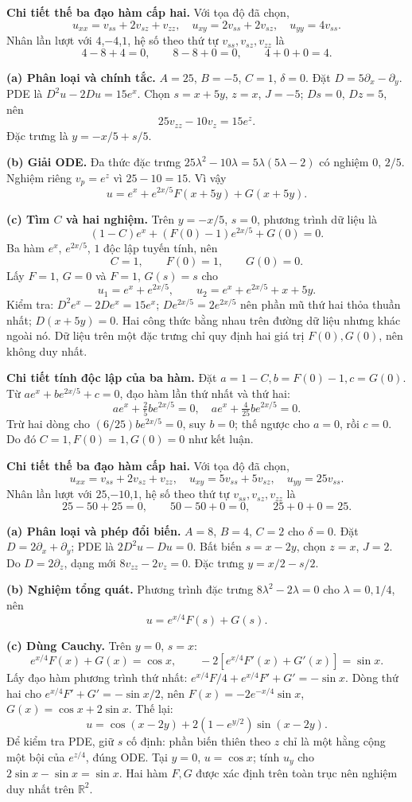 \textbf{Chi tiết thế ba đạo hàm cấp hai.} Với tọa độ đã chọn,
\[u_{xx}=v_{ss}+2v_{sz}+v_{zz},\quad u_{xy}=2v_{ss}+2v_{sz},\quad u_{yy}=4v_{ss}.\]
Nhân lần lượt với $4$,$-4$,$1$, hệ số theo thứ tự $v_{ss},v_{sz},v_{zz}$ là
\[4-8+4=0,\qquad 8-8+0=0,\qquad 4+0+0=4.\]

\textbf{(a) Phân loại và chính tắc.} $A=25$, $B=-5$, $C=1$, $\delta=0$. Đặt $D=5\partial_x-\partial_y$. PDE là $D^2u-2Du=15e^x$. Chọn $s=x+5y$, $z=x$, $J=-5$; $Ds=0$, $Dz=5$, nên
\[25v_{zz}-10v_z=15e^z.\]
Đặc trưng là $y=-x/5+s/5$.

\textbf{(b) Giải ODE.} Đa thức đặc trưng $25\lambda^2-10\lambda=5\lambda(5\lambda-2)$ có nghiệm $0$, $2/5$. Nghiệm riêng $v_p=e^z$ vì $25-10=15$. Vì vậy
\[u=e^x+e^{2x/5}F(x+5y)+G(x+5y).\]

\textbf{(c) Tìm $C$ và hai nghiệm.} Trên $y=-x/5$, $s=0$, phương trình dữ liệu là
\[(1-C)e^x+(F(0)-1)e^{2x/5}+G(0)=0.\]
Ba hàm $e^x$, $e^{2x/5}$, $1$ độc lập tuyến tính, nên
\[\boxed{C=1,\qquad F(0)=1,\qquad G(0)=0.}\]
Lấy $F=1$, $G=0$ và $F=1$, $G(s)=s$ cho
\[u_1=e^x+e^{2x/5},\qquad u_2=e^x+e^{2x/5}+x+5y.\]
Kiểm tra: $D^2e^x-2De^x=15e^x$; $De^{2x/5}=2e^{2x/5}$ nên phần mũ thứ hai thỏa thuần nhất; $D(x+5y)=0$. Hai công thức bằng nhau trên đường dữ liệu nhưng khác ngoài nó. Dữ liệu trên một đặc trưng chỉ quy định hai giá trị $F(0),G(0)$, nên không duy nhất.

\textbf{Chi tiết tính độc lập của ba hàm.} Đặt $a=1-C,b=F(0)-1,c=G(0)$. Từ $ae^x+be^{2x/5}+c=0$, đạo hàm lần thứ nhất và thứ hai:
\[ae^x+\tfrac25be^{2x/5}=0,\quad ae^x+\tfrac4{25}be^{2x/5}=0.\]
Trừ hai dòng cho $(6/25)be^{2x/5}=0$, suy $b=0$; thế ngược cho $a=0$, rồi $c=0$. Do đó $C=1,F(0)=1,G(0)=0$ như kết luận.

\textbf{Chi tiết thế ba đạo hàm cấp hai.} Với tọa độ đã chọn,
\[u_{xx}=v_{ss}+2v_{sz}+v_{zz},\quad u_{xy}=5v_{ss}+5v_{sz},\quad u_{yy}=25v_{ss}.\]
Nhân lần lượt với $25$,$-10$,$1$, hệ số theo thứ tự $v_{ss},v_{sz},v_{zz}$ là
\[25-50+25=0,\qquad 50-50+0=0,\qquad 25+0+0=25.\]

\textbf{(a) Phân loại và phép đổi biến.} $A=8$, $B=4$, $C=2$ cho $\delta=0$. Đặt $D=2\partial_x+\partial_y$; PDE là $2D^2u-Du=0$. Bất biến $s=x-2y$, chọn $z=x$, $J=2$. Do $D=2\partial_z$, dạng mới $8v_{zz}-2v_z=0$. Đặc trưng $y=x/2-s/2$.

\textbf{(b) Nghiệm tổng quát.} Phương trình đặc trưng $8\lambda^2-2\lambda=0$ cho $\lambda=0,1/4$, nên
\[u=e^{x/4}F(s)+G(s).\]

\textbf{(c) Dùng Cauchy.} Trên $y=0$, $s=x$:
\[e^{x/4}F(x)+G(x)=\cos x,\qquad
-2[e^{x/4}F'(x)+G'(x)]=\sin x.\]
Lấy đạo hàm phương trình thứ nhất: $e^{x/4}F/4+e^{x/4}F'+G'=-\sin x$. Dòng thứ hai cho $e^{x/4}F'+G'=-\sin x/2$, nên $F(x)=-2e^{-x/4}\sin x$, $G(x)=\cos x+2\sin x$. Thế lại:
\[\boxed{u=\cos(x-2y)+2(1-e^{y/2})\sin(x-2y).}\]
Để kiểm tra PDE, giữ $s$ cố định: phần biến thiên theo $z$ chỉ là một hằng cộng một bội của $e^{z/4}$, đúng ODE. Tại $y=0$, $u=\cos x$; tính $u_y$ cho $2\sin x-\sin x=\sin x$. Hai hàm $F,G$ được xác định trên toàn trục nên nghiệm duy nhất trên $\mathbb R^2$.

